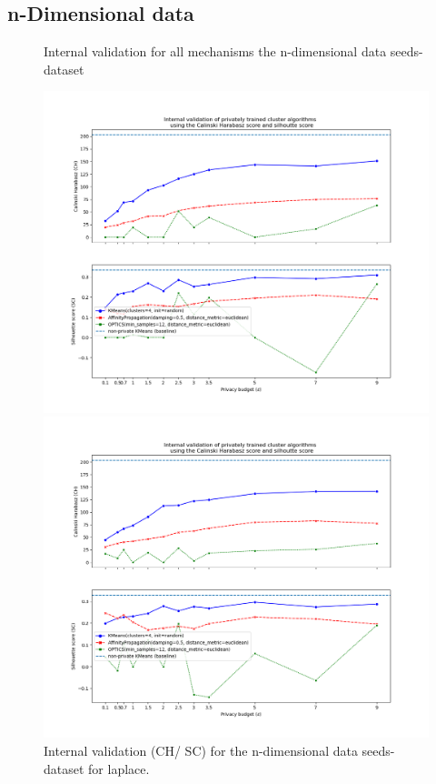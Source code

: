\subsection{n-Dimensional data}
\begin{figure}[H]
    \caption{Internal validation for all mechanisms the n-dimensional data seeds-dataset}
    \centering
    \begin{minipage}[c]{0.49\textwidth}
        \includegraphics[width=1\textwidth]{Results/nd-laplace/seeds-dataset/ch-and-sc.png}
        \caption{Internal validation (CH/ SC) for the n-dimensional data seeds-dataset for laplace.}
        \label{fig:appendix-internal-validation-seeds-dataset_comparison_nd-laplace}
    \end{minipage}
    \begin{minipage}[c]{0.49\textwidth}
        \includegraphics[width=1\textwidth]{Results/nd-laplace-truncated/seeds-dataset/ch-and-sc.png}

\end{minipage}
\end{figure}
